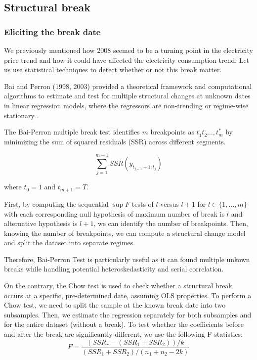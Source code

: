 \subsection{Structural break}
\subsubsection{Eliciting the break date}
We previously mentioned how 2008 seemed to be a turning point in the electricity price trend and how it could have affected the electricity consumption trend. Let us use statistical techniques to detect whether or not this break matter. 

Bai and Perron (1998, 2003) provided a theoretical framework and computational algorithms to estimate and test for multiple structural changes at unknown dates in linear regression models, where the regressors are non-trending or regime-wise stationary \cite{bai1998estimating, bai2003computation}. 

The Bai-Perron multiple break test \cite{bai1998estimating} identifies $m$ breakpoints as $t_1^, t_2^, \dots, t_m^*$ by minimizing the sum of squared residuals (SSR) across different segments. 

$$\sum_{j=1}^{m+1} SSR(y_{t_{j-1}+1:t_j})$$

where $t_0 = 1$ and $t_{m+1} = T$. 

First, by computing the sequential $\sup F$ tests of $l$ versus $l+1$ for $l \in \{1, \dots, m\}$ with each corresponding null hypothesis of maximum number of break is $l$ and alternative hypothesis is $l+1$, we can identify the number of breakpoints. Then, knowing the number of breakpoints, we can compute a structural change model and split the dataset into separate regimes. 

Therefore, Bai-Perron Test is particularly useful as it can found multiple unkown breaks while handling potential heteroskedasticity and serial correlation.

On the contrary, the Chow test \cite{chow1960tests} is used to check whether a structural break occurs at a specific, pre-determined date, assuming OLS properties. To perform a Chow test, we need to split the sample at the known break date into two subsamples. Then, we estimate the regression separately for both subsamples and for the entire dataset (without a break). To test whether the coefficients before and after the break are significantly different, we use the following F-statistics:
$$F = \frac{(SSR_r - (SSR_1 + SSR_2)) / k}{(SSR_1 + SSR_2) / (n_1 + n_2 - 2k)}$$

